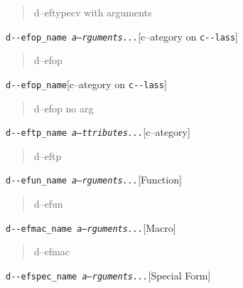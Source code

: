 \documentclass{book}
\begin{document}
\begin{titlepage}
%
\begin{quote}
\unskip{\parskip=0pt\noindent}%
d--eftypecv with arguments
\end{quote}

\noindent\texttt{d{-}{-}efop\_name \EmbracOn{}\textnormal{\textsl{a--rguments...}}\EmbracOff{}}\hfill[c--ategory on \texttt{c{-}{-}lass}]



%
\begin{quote}
\unskip{\parskip=0pt\noindent}%
d--efop
\end{quote}

\noindent\texttt{d{-}{-}efop\_name}\hfill[c--ategory on \texttt{c{-}{-}lass}]



%
\begin{quote}
\unskip{\parskip=0pt\noindent}%
d--efop no arg
\end{quote}

\noindent\texttt{d{-}{-}eftp\_name \EmbracOn{}\textnormal{\textsl{a--ttributes...}}\EmbracOff{}}\hfill[c--ategory]



%
\begin{quote}
\unskip{\parskip=0pt\noindent}%
d--eftp
\end{quote}

\noindent\texttt{d{-}{-}efun\_name \EmbracOn{}\textnormal{\textsl{a--rguments...}}\EmbracOff{}}\hfill[Function]



%
\begin{quote}
\unskip{\parskip=0pt\noindent}%
d--efun
\end{quote}

\noindent\texttt{d{-}{-}efmac\_name \EmbracOn{}\textnormal{\textsl{a--rguments...}}\EmbracOff{}}\hfill[Macro]



%
\begin{quote}
\unskip{\parskip=0pt\noindent}%
d--efmac
\end{quote}

\noindent\texttt{d{-}{-}efspec\_name \EmbracOn{}\textnormal{\textsl{a--rguments...}}\EmbracOff{}}\hfill[Special Form]




\end{titlepage}
\end{document}
